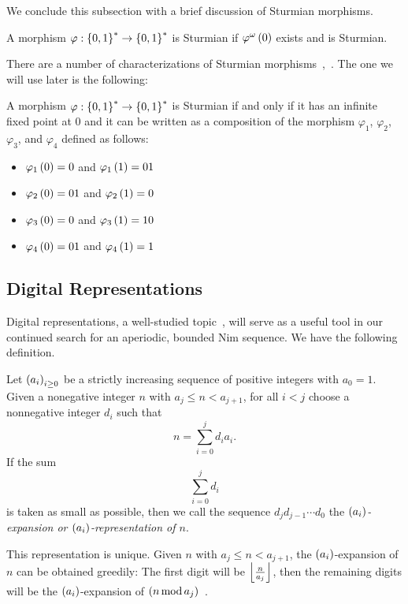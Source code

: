 \documentclass[english,12pt]{article}
\newcommand{\seq}{\p}
\begin{document}
We conclude this subsection with a brief discussion of Sturmian morphisms.
\begin{defin}\label{def:sturmmorph}
A morphism $\varphi:\left\{0,1\right\}^*\to\left\{0,1\right\}^*$ is Sturmian if $\varphi^\omega\left(0\right)$ exists and is Sturmian.
\end{defin}
There are a number of characterizations of Sturmian morphisms~\cite{BeSe},~\cite{rich}.  The one we will use later is the following:
\begin{prop}\label{prop:sturmmorph}\cite{rich}
A morphism $\varphi:\left\{0,1\right\}^*\to\left\{0,1\right\}^*$ is Sturmian if and only if it has an infinite fixed point at $0$ and it can be written as a composition of the morphism $\varphi_1$, $\varphi_2$, $\varphi_3$, and $\varphi_4$ defined as follows:
\begin{itemize}
\item$\varphi_1\left(0\right)=0$ and $\varphi_1\left(1\right)=01$
\item$\varphi_2\left(0\right)=01$ and $\varphi_2\left(1\right)=0$
\item$\varphi_3\left(0\right)=0$ and $\varphi_3\left(1\right)=10$
\item$\varphi_4\left(0\right)=01$ and $\varphi_4\left(1\right)=1$
\end{itemize}
\end{prop}
\subsection{Digital Representations}\label{ss:digrep}
Digital representations, a well-studied topic~\cite{drmota}, will serve as a useful tool in our continued search for an aperiodic, bounded Nim sequence.  We have the following definition.
\begin{defin}\cite{drmota}
Let $\seq{a_i}_{i\geq0}$ be a strictly increasing sequence of positive integers with $a_0=1$.  Given a nonegative integer $n$ with $a_j\leq n<a_{j+1}$, for all $i<j$ choose a nonnegative integer $d_i$ such that
\[
n=\sum_{i=0}^j d_ia_i.
\]
If the sum
\[
\sum_{i=0}^j d_i
\]
is taken as small as possible, then we call the sequence $d_jd_{j-1}\cdots d_0$ the \emph{$\seq{a_i}$-expansion or $\seq{a_i}$-representation of $n$}.
\end{defin}
This representation is unique.  Given $n$ with $a_j\leq n<a_{j+1}$,
the $\seq{a_i}$-expansion of $n$ can be obtained greedily: The first digit will be $\left\lfloor\frac{n}{a_j}\right\rfloor$, then the remaining digits will be the $\seq{a_i}$-expansion of $\left(n\operatorname{mod} a_j\right)$~\cite{drmota}.
\end{document}
